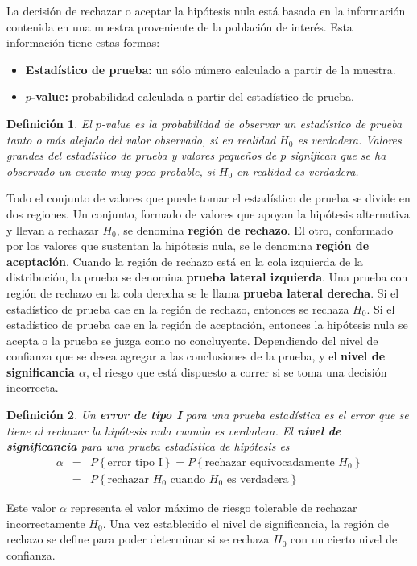 \documentclass[a4paper]{report} %
\newtheorem{Def}{Definici\'on}[chapter]
\begin{document}
La decisi\'on de rechazar o aceptar la hip\'otesis nula est\'a basada en la informaci\'on contenida en una muestra proveniente de la poblaci\'on de inter\'es. Esta informaci\'on tiene estas formas:
\begin{itemize}
    \item \textbf{Estad\'istico de prueba:} un s\'olo n\'umero calculado a partir de la muestra.
    \item \textbf{$p$-value:} probabilidad calculada a partir del estad\'istico de prueba.
\end{itemize}

\begin{Def}
El $p$-value es la probabilidad de observar un estad\'istico de prueba tanto o m\'as alejado del valor observado, si en realidad $H_{0}$ es verdadera. Valores grandes del estad\'istico de prueba y valores peque\~nos de $p$ significan que se ha observado un evento muy poco probable, si $H_{0}$ en realidad es verdadera.
\end{Def}

Todo el conjunto de valores que puede tomar el estad\'istico de prueba se divide en dos regiones. Un conjunto, formado de valores que apoyan la hip\'otesis alternativa y llevan a rechazar $H_{0}$, se denomina \textbf{regi\'on de rechazo}. El otro, conformado por los valores que sustentan la hip\'otesis nula, se le denomina \textbf{regi\'on de aceptaci\'on}. Cuando la regi\'on de rechazo est\'a en la cola izquierda de la distribuci\'on, la prueba se denomina \textbf{prueba lateral izquierda}. Una prueba con regi\'on de rechazo en la cola derecha se le llama \textbf{prueba lateral derecha}. Si el estad\'istico de prueba cae en la regi\'on de rechazo, entonces se rechaza $H_{0}$. Si el estad\'istico de prueba cae en la regi\'on de aceptaci\'on, entonces la hip\'otesis nula se acepta o la prueba se juzga como no concluyente. Dependiendo del nivel de confianza que se desea agregar a las conclusiones de la prueba, y el \textbf{nivel de significancia $\alpha$}, el riesgo que est\'a dispuesto a correr si se toma una decisi\'on incorrecta.

\begin{Def}
Un \textbf{error de tipo I} para una prueba estad\'istica es el error que se tiene al rechazar la hip\'otesis nula cuando es verdadera. El \textbf{nivel de significancia} para una prueba estad\'istica de hip\'otesis es
\begin{eqnarray*}
\alpha &=& P\left\{\textrm{error tipo I}\right\} = P\left\{\textrm{rechazar equivocadamente } H_{0}\right\} \\
&=& P\left\{\textrm{rechazar } H_{0} \textrm{ cuando } H_{0} \textrm{ es verdadera}\right\}
\end{eqnarray*}
\end{Def}
Este valor $\alpha$ representa el valor m\'aximo de riesgo tolerable de rechazar incorrectamente $H_{0}$. Una vez establecido el nivel de significancia, la regi\'on de rechazo se define para poder determinar si se rechaza $H_{0}$ con un cierto nivel de confianza.
\end{document}
